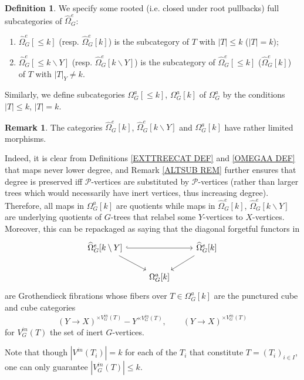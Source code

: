 \documentclass[a4paper,10pt
,draft
]{article}%
\numberwithin{equation}{section}
\numberwithin{figure}{section}
\theoremstyle{definition} %
\newtheorem{definition}[equation]{Definition}%
\newtheorem{remark}[equation]{Remark}%
\newcommand{\1}{\ensuremath{\mathbbm 1}}%
\begin{document}
\begin{definition}\label{TREE_FILTRATION_PIECES_DEFINITION}
We specify some rooted (i.e. closed under root pullbacks)
full subcategories
 of $\widehat{\Omega}_{G}^e$: 
  \begin{enumerate}
  \item $\widehat{\Omega}_G^e[\leq\! k]$ 
  (resp. $\widehat{\Omega}_G^e[k]$) is the subcategory of $T$ with $|T|\leq k$ ($|T| = k$);
  \item $\widehat{\Omega}_G^e[\leq\! k \mathbin{\backslash} Y]$
  (resp. $\widehat{\Omega}_G^e[k \mathbin{\backslash} Y]$) is the subcategory of $\widehat{\Omega}_G^e[\leq\! k]$ 
  ($\widehat{\Omega}_G^e[k]$) of $T$ with $|T|_{Y}\neq k$.
  \end{enumerate}
Similarly, we define subcategories 
$\Omega_G^a[\leq \! k]$, 
$\Omega_G^a[k]$ of $\Omega_G^a$
by the conditions $|T|\leq k$, $|T|=k$.
\end{definition}


\begin{remark}\label{LIMMOR REM}
  The categories 
  $\widehat{\Omega}_G^e[k]$, $\widehat{\Omega}_G^e[k \mathbin{\backslash} Y]$ and $\Omega_G^a[k]$
  have rather limited morphisms.
  
Indeed, it is clear from Definitions 
\ref{EXTTREECAT DEF} and \ref{OMEGAA DEF} 
that maps never lower degree,
and Remark \ref{ALTSUB REM} further ensures that degree is preserved iff
$\mathcal{P}$-vertices are substituted by $\mathcal{P}$-vertices (rather than larger trees
which would necessarily have inert vertices, thus increasing degree).
Therefore, all maps in $\Omega_G^a[k]$ are quotients while maps in $\widehat{\Omega}_G^e[k]$, $\widehat{\Omega}_G^e[k \mathbin{\backslash} Y]$
are underlying quotients of $G$-trees that 
relabel some $Y$-vertices to $X$-vertices.  
 Moreover, this can be repackaged as saying that 
  the diagonal forgetful functors in
\[
\begin{tikzcd}
  \widehat\Omega_G^e[k \mathbin{\backslash} Y] \arrow[dr] \arrow[rr, hookrightarrow] 
  && \widehat\Omega_G^e[k] \arrow[dl]\\
  & \Omega_G^a[k]
\end{tikzcd}
\]  
 are Grothendieck fibrations whose fibers over 
 $T \in \Omega_G^a[k]$
 are the punctured cube and cube categories
\[
	(Y \to X)^{\times V_G^{in}(T)} - Y^{\times  V_G^{in}(T)},
\qquad
	(Y \to X)^{\times V_G^{in}(T)}
\]
for $V_G^{in}(T)$ the set of inert $G$-vertices.

Note that though 
$|V^{in}(T_i)| = k$
for each of the $T_i$ that constitute $T=(T_i)_{i \in I}$,
one can only guarantee $|V_G^{in}(T)| \leq k$.
\end{remark}
\end{document}
